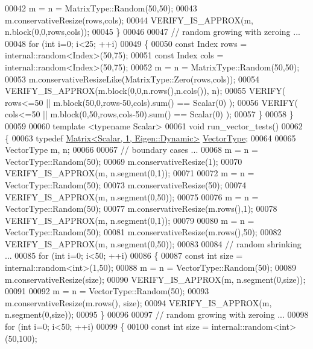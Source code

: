 \begin{DoxyCode}
00042     m = n = MatrixType::Random(50,50);
00043     m.conservativeResize(rows,cols);
00044     VERIFY\_IS\_APPROX(m, n.block(0,0,rows,cols));
00045   \}
00046 
00047   \textcolor{comment}{// random growing with zeroing ...}
00048   \textcolor{keywordflow}{for} (\textcolor{keywordtype}{int} i=0; i<25; ++i)
00049   \{
00050     \textcolor{keyword}{const} Index rows = internal::random<Index>(50,75);
00051     \textcolor{keyword}{const} Index cols = internal::random<Index>(50,75);
00052     m = n = MatrixType::Random(50,50);
00053     m.conservativeResizeLike(MatrixType::Zero(rows,cols));
00054     VERIFY\_IS\_APPROX(m.block(0,0,n.rows(),n.cols()), n);
00055     VERIFY( rows<=50 || m.block(50,0,rows-50,cols).sum() == Scalar(0) );
00056     VERIFY( cols<=50 || m.block(0,50,rows,cols-50).sum() == Scalar(0) );
00057   \}
00058 \}
00059 
00060 \textcolor{keyword}{template} <\textcolor{keyword}{typename} Scalar>
00061 \textcolor{keywordtype}{void} run\_vector\_tests()
00062 \{
00063   \textcolor{keyword}{typedef} \hyperlink{group___core___module_class_eigen_1_1_matrix}{Matrix<Scalar, 1, Eigen::Dynamic>} 
      \hyperlink{struct_vector_type}{VectorType};
00064 
00065   VectorType m, n;
00066 
00067   \textcolor{comment}{// boundary cases ...}
00068   m = n = VectorType::Random(50);
00069   m.conservativeResize(1);
00070   VERIFY\_IS\_APPROX(m, n.segment(0,1));
00071 
00072   m = n = VectorType::Random(50);
00073   m.conservativeResize(50);
00074   VERIFY\_IS\_APPROX(m, n.segment(0,50));
00075   
00076   m = n = VectorType::Random(50);
00077   m.conservativeResize(m.rows(),1);
00078   VERIFY\_IS\_APPROX(m, n.segment(0,1));
00079 
00080   m = n = VectorType::Random(50);
00081   m.conservativeResize(m.rows(),50);
00082   VERIFY\_IS\_APPROX(m, n.segment(0,50));
00083 
00084   \textcolor{comment}{// random shrinking ...}
00085   \textcolor{keywordflow}{for} (\textcolor{keywordtype}{int} i=0; i<50; ++i)
00086   \{
00087     \textcolor{keyword}{const} \textcolor{keywordtype}{int} size = internal::random<int>(1,50);
00088     m = n = VectorType::Random(50);
00089     m.conservativeResize(size);
00090     VERIFY\_IS\_APPROX(m, n.segment(0,size));
00091     
00092     m = n = VectorType::Random(50);
00093     m.conservativeResize(m.rows(), size);
00094     VERIFY\_IS\_APPROX(m, n.segment(0,size));
00095   \}
00096 
00097   \textcolor{comment}{// random growing with zeroing ...}
00098   \textcolor{keywordflow}{for} (\textcolor{keywordtype}{int} i=0; i<50; ++i)
00099   \{
00100     \textcolor{keyword}{const} \textcolor{keywordtype}{int} size = internal::random<int>(50,100);

\end{DoxyCode}
